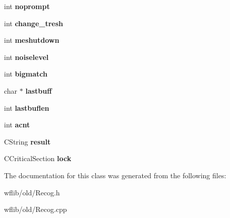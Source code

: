 \begin{DoxyCompactItemize}
\item 
\hypertarget{class_c_recog_ab55c05e5e82398a5119152278557d67a}{int {\bfseries noprompt}}\label{class_c_recog_ab55c05e5e82398a5119152278557d67a}

\item 
\hypertarget{class_c_recog_a8806d6abc2a0f6584f3e5c477dd5ff78}{int {\bfseries change\-\_\-tresh}}\label{class_c_recog_a8806d6abc2a0f6584f3e5c477dd5ff78}

\item 
\hypertarget{class_c_recog_a02184027c4b86dba84b604941dd3575a}{int {\bfseries meshutdown}}\label{class_c_recog_a02184027c4b86dba84b604941dd3575a}

\item 
\hypertarget{class_c_recog_abb5bcfcb9b05f294599c5025d8d7c5f5}{int {\bfseries noiselevel}}\label{class_c_recog_abb5bcfcb9b05f294599c5025d8d7c5f5}

\item 
\hypertarget{class_c_recog_acfaaf024a64c6a023075748b2e742d02}{int {\bfseries bigmatch}}\label{class_c_recog_acfaaf024a64c6a023075748b2e742d02}

\item 
\hypertarget{class_c_recog_aae82be22ae60676ff94e395a298ae249}{char $\ast$ {\bfseries lastbuff}}\label{class_c_recog_aae82be22ae60676ff94e395a298ae249}

\item 
\hypertarget{class_c_recog_ac2a5f1b0bef38a2dec8a5db6098a7556}{int {\bfseries lastbuflen}}\label{class_c_recog_ac2a5f1b0bef38a2dec8a5db6098a7556}

\item 
\hypertarget{class_c_recog_a025f5408d63ced59b9368b15f96fa409}{int {\bfseries acnt}}\label{class_c_recog_a025f5408d63ced59b9368b15f96fa409}

\item 
\hypertarget{class_c_recog_a5bde6fc94f5cb48a177a2d6bb485819c}{C\-String {\bfseries result}}\label{class_c_recog_a5bde6fc94f5cb48a177a2d6bb485819c}

\item 
\hypertarget{class_c_recog_a4ad2085511dd5e5aecb06f008690b7a9}{C\-Critical\-Section {\bfseries lock}}\label{class_c_recog_a4ad2085511dd5e5aecb06f008690b7a9}

\end{DoxyCompactItemize}


The documentation for this class was generated from the following files\-:\begin{DoxyCompactItemize}
\item 
wflib/old/Recog.\-h\item 
wflib/old/Recog.\-cpp\end{DoxyCompactItemize}
